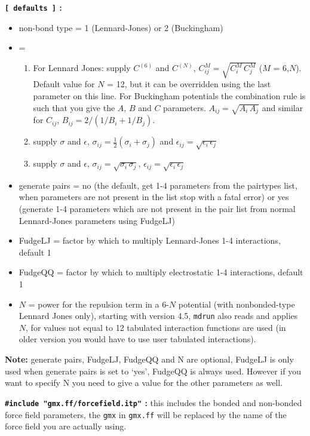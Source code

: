 {\bf {\tt [~defaults~]} :}
\begin{itemize}
\item non-bond type = 1 (Lennard-Jones) or 2 (Buckingham)\\
\item {} = 
\begin{enumerate}
\item For Lennard Jones: supply $C^{(6)}$ and $C^{(N)}$,
$C^{M}_{ij}=\sqrt{C^M_i\,C^M_j}$ ($M$ = 6,$N$).
Default value for $N$ = 12, but it can be
overridden using the last parameter on this line.
For Buckingham potentials the combination rule is such that you give the
$A$, $B$ and $C$ parameters. $A_{ij} = \sqrt{A_i\, A_j}$ and similar for 
$C_{ij}$, $B_{ij} = 2/(1/B_i + 1/B_j)$.
\item supply $\sigma$ and $\epsilon$,
$\sigma_{ij}=\frac{1}{2}(\sigma_i+\sigma_j)$ and 
$\epsilon_{ij}=\sqrt{\epsilon_i\,\epsilon_j}$
\item supply $\sigma$ and $\epsilon$, $\sigma_{ij}=\sqrt{\sigma_i\,\sigma_j}$,
$\epsilon_{ij}=\sqrt{\epsilon_i\,\epsilon_j}$
\end{enumerate}
\item generate pairs = no
(the default, get 1-4 parameters from the pairtypes list, when parameters
are not present in the list stop with a fatal error)
or yes (generate 1-4 parameters which are not present in the pair list
from normal Lennard-Jones parameters using FudgeLJ)
\item FudgeLJ = factor by which to multiply Lennard-Jones 1-4 interactions, default 1
\item FudgeQQ = factor by which to multiply electrostatic 1-4 interactions, default 1
\item $N$ = power for the repulsion term in a 6-$N$ potential (with 
nonbonded-type Lennard Jones only), starting with {\gromacs} version 4.5,
{\tt mdrun} also reads and applies $N$, for values not equal to 12 tabulated
interaction functions are used
(in older version you would have to use user tabulated interactions).
\end{itemize}
{\bf Note:} generate pairs, FudgeLJ, FudgeQQ and N are optional,
FudgeLJ is only used when generate pairs is set to `yes',
FudgeQQ is always used. However if you
want to specify N you need to give a value for the other parameters as well.

%

{\bf {\tt \#include "gmx.ff/forcefield.itp"} :} this includes the bonded and
non-bonded force field parameters, the {\tt gmx} in {\tt gmx.ff} will be
replaced by the name of the force field you are actually using.

